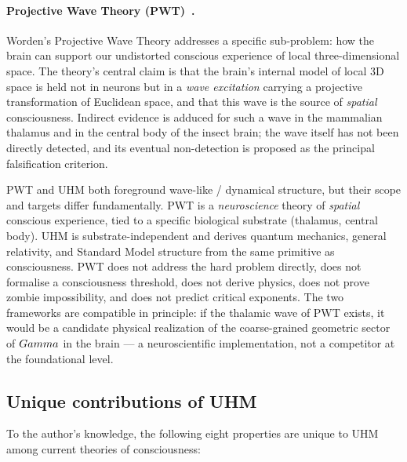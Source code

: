\paragraph{Projective Wave Theory (PWT)~\cite{worden2026}.}
Worden's Projective Wave Theory addresses a specific sub-problem: how the
brain can support our undistorted conscious experience of local three-dimensional
space. The theory's central claim is that the brain's internal model of local
3D space is held not in neurons but in a \emph{wave excitation} carrying a
projective transformation of Euclidean space, and that this wave is the source
of \emph{spatial} consciousness. Indirect evidence is adduced for such a wave
in the mammalian thalamus and in the central body of the insect brain; the
wave itself has not been directly detected, and its eventual non-detection is
proposed as the principal falsification criterion.

PWT and UHM both foreground wave-like / dynamical structure, but their scope
and targets differ fundamentally. PWT is a \emph{neuroscience} theory of
\emph{spatial} conscious experience, tied to a specific biological substrate
(thalamus, central body). UHM is substrate-independent and derives quantum
mechanics, general relativity, and Standard Model structure from the same
primitive as consciousness. PWT does not address the hard problem directly,
does not formalise a consciousness threshold, does not derive physics, does
not prove zombie impossibility, and does not predict critical exponents. The
two frameworks are compatible in principle: if the thalamic wave of PWT
exists, it would be a candidate physical realization of the
coarse-grained geometric sector of $Gamma$ in the brain
--- a neuroscientific implementation, not a competitor at the foundational
level.

\subsection{Unique contributions of UHM}

To the author's knowledge, the following eight properties are unique to UHM
among current theories of consciousness:

